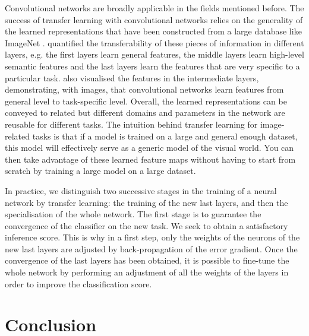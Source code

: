 Convolutional networks are broadly applicable in the fields mentioned before. The success of transfer learning with convolutional networks relies on the generality of the learned representations that have been constructed from a large database like ImageNet \citep{deng2009imagenet}. \citep{yosinski2014transferable} quantified the transferability of these pieces of information in different layers, e.g. the first layers learn general features, the middle layers learn high-level semantic features and the last layers learn the features that are very specific to a particular task. \citep{zeiler2014visualizing} also visualised the features in the intermediate layers, demonstrating, with images, that convolutional networks learn features from general level to task-specific level. Overall, the learned representations can be conveyed to related but different domains and parameters in the network are reusable for different tasks. The intuition behind transfer learning for image-related tasks is that if a model is trained on a large and general enough dataset, this model will effectively serve as a generic model of the visual world. You can then take advantage of these learned feature maps without having to start from scratch by training a large model on a large dataset.

In practice, we distinguish two successive stages in the training of a neural network by transfer learning: the training of the new last layers, and then the specialisation of the whole network. The first stage is to guarantee the convergence of the classifier on the new task. We seek to obtain a satisfactory inference score. This is why in a first step, only the weights of the neurons of the new last layers are adjusted by back-propagation of the error gradient. Once the convergence of the last layers has been obtained, it is possible to fine-tune the whole network by performing an adjustment of all the weights of the layers in order to improve the classiﬁcation score.


\section{Conclusion}

